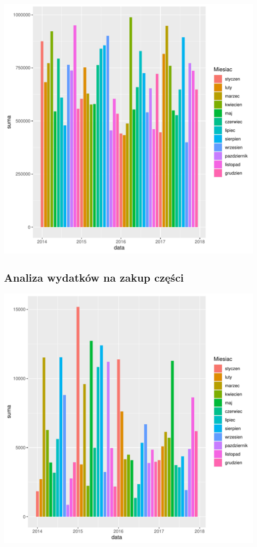 \documentclass{article}\usepackage[]{graphicx}\usepackage[]{xcolor}
\makeatletter
\def\maxwidth{ %
  \ifdim\Gin@nat@width>\linewidth
    \linewidth
  \else
    \Gin@nat@width
  \fi
}
\newenvironment{knitrout}{}{} %
\makeatother
\begin{document}
\begin{knitrout}
\color{fgcolor}
\includegraphics[width=\maxwidth]{figure/unnamed-chunk-5-1} 
\end{knitrout}


\subsection{Analiza wydatków na zakup części}

\begin{knitrout}
\color{fgcolor}
\includegraphics[width=\maxwidth]{figure/unnamed-chunk-6-1} 
\end{knitrout}
\end{document}
